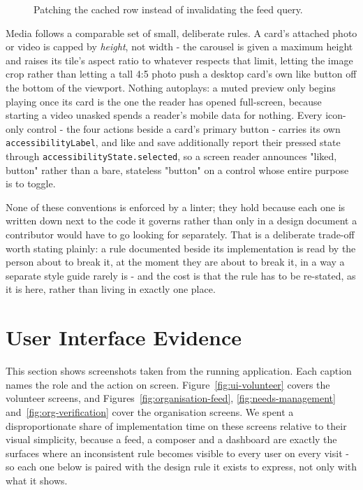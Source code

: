\begin{figure}[H]
    \centering
    \caption{Patching the cached row instead of invalidating the feed query.}
    \label{fig:optimistic-update}
\end{figure}

\noindent Media follows a comparable set of small, deliberate rules. A card's attached photo or video is capped by \emph{height}, not width - the carousel is given a maximum height and raises its tile's aspect ratio to whatever respects that limit, letting the image crop rather than letting a tall 4:5 photo push a desktop card's own like button off the bottom of the viewport. Nothing autoplays: a muted preview only begins playing once its card is the one the reader has opened full-screen, because starting a video unasked spends a reader's mobile data for nothing. Every icon-only control - the four actions beside a card's primary button - carries its own \texttt{accessibilityLabel}, and like and save additionally report their pressed state through \texttt{accessibilityState.selected}, so a screen reader announces "liked, button" rather than a bare, stateless "button" on a control whose entire purpose is to toggle.

\noindent None of these conventions is enforced by a linter; they hold because each one is written down next to the code it governs rather than only in a design document a contributor would have to go looking for separately. That is a deliberate trade-off worth stating plainly: a rule documented beside its implementation is read by the person about to break it, at the moment they are about to break it, in a way a separate style guide rarely is - and the cost is that the rule has to be re-stated, as it is here, rather than living in exactly one place.

\section{User Interface Evidence}
\label{sec:impl-ui}
This section shows screenshots taken from the running application. Each caption names the role and the action on screen. Figure~\ref{fig:ui-volunteer} covers the volunteer screens, and Figures~\ref{fig:organisation-feed}, \ref{fig:needs-management} and~\ref{fig:org-verification} cover the organisation screens. We spent a disproportionate share of implementation time on these screens relative to their visual simplicity, because a feed, a composer and a dashboard are exactly the surfaces where an inconsistent rule becomes visible to every user on every visit - so each one below is paired with the design rule it exists to express, not only with what it shows.

